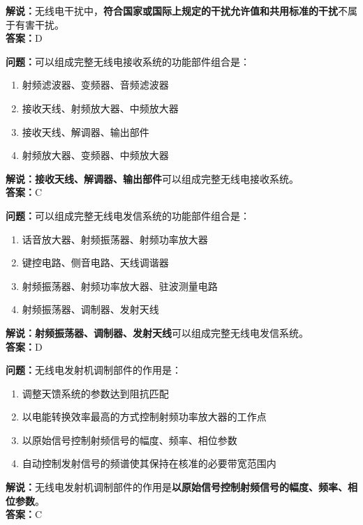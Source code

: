 \textbf{解说：}无线电干扰中，\textbf{符合国家或国际上规定的干扰允许值和共用标准的干扰}不属于有害干扰。\\\textbf{答案：}D%



\textbf{问题：}可以组成完整无线电接收系统的功能部件组合是：

\begin{enumerate}[label=\Alph*), leftmargin=1.5cm]
	\item 射频滤波器、变频器、音频滤波器
	\item 接收天线、射频放大器、中频放大器
	\item 接收天线、解调器、输出部件
	\item 射频放大器、变频器、中频放大器
\end{enumerate}

\textbf{解说：}\textbf{接收天线、解调器、输出部件}可以组成完整无线电接收系统。\\\textbf{答案：}C%



\textbf{问题：}可以组成完整无线电发信系统的功能部件组合是：

\begin{enumerate}[label=\Alph*), leftmargin=1.5cm]
	\item 话音放大器、射频振荡器、射频功率放大器
	\item 键控电路、侧音电路、天线调谐器
	\item 射频振荡器、射频功率放大器、驻波测量电路
	\item 射频振荡器、调制器、发射天线
\end{enumerate}

\textbf{解说：}\textbf{射频振荡器、调制器、发射天线}可以组成完整无线电发信系统。\\\textbf{答案：}D%



\textbf{问题：}无线电发射机调制部件的作用是：

\begin{enumerate}[label=\Alph*), leftmargin=1.5cm]
	\item 调整天馈系统的参数达到阻抗匹配
	\item 以电能转换效率最高的方式控制射频功率放大器的工作点
	\item 以原始信号控制射频信号的幅度、频率、相位参数
	\item 自动控制发射信号的频谱使其保持在核准的必要带宽范围内
\end{enumerate}

\textbf{解说：}无线电发射机调制部件的作用是\textbf{以原始信号控制射频信号的幅度、频率、相位参数}。\\\textbf{答案：}C%



